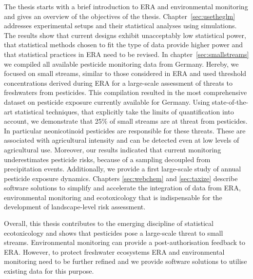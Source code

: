 The thesis starts with a brief introduction to ERA and environmental monitoring and gives an overview of the objectives of the thesis.
Chapter~\ref{sec:usetheglm} addresses experimental setups and their statistical analyses using simulations. 
The results show that current designs exhibit unacceptably low statistical power, that statistical methods chosen to fit the type of data provide higher power and that statistical practices in ERA need to be revised.
In chapter~\ref{sec:smallstreams} we compiled all available pesticide monitoring data from Germany.
Hereby, we focused on small streams, similar to those considered in ERA and used threshold concentrations derived during ERA for a large-scale assessment of threats to freshwaters from pesticides. 
This compilation resulted in the most comprehensive dataset on pesticide exposure currently available for Germany.
Using state-of-the-art statistical techniques, that explicitly take the limits of quantification into account, we demonstrate that 25\% of small streams are at threat from pesticides. 
In particular neonicotinoid pesticides are responsible for these threats.
These are associated with agricultural intensity and can be detected even at low levels of agricultural use. 
Moreover, our results indicated that current monitoring underestimates pesticide risks, because of a sampling decoupled from precipitation events.
Additionally, we provide a first large-scale study of annual pesticide exposure dynamics.
Chapters \ref{sec:webchem} and \ref{sec:taxize} describe software solutions to simplify and accelerate the integration of data from ERA, environmental monitoring and ecotoxicology that is indispensable for the development of landscape-level risk assessment.

Overall, this thesis contributes to the emerging discipline of statistical ecotoxicology and shows that pesticides pose a large-scale threat to small streams.
Environmental monitoring can provide a post-authorisation feedback to ERA.
However, to protect freshwater ecosystems ERA and environmental monitoring need to be further refined and we provide software solutions to utilise existing data for this purpose.



\endgroup 
 
